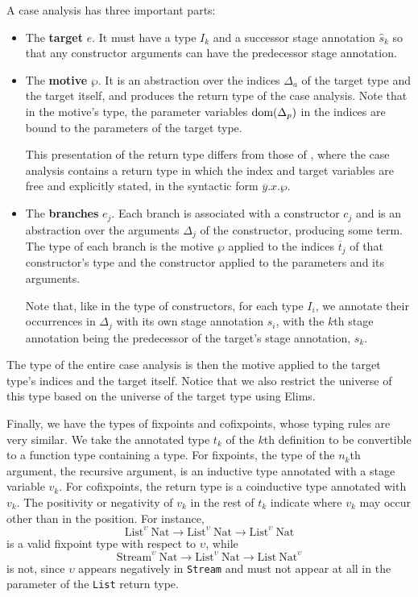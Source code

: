 \documentclass[nonacm,screen,10pt]{acmart}
\begin{document}
A case analysis has three important parts:
\begin{itemize}
    \item The \textbf{target} $e$. It must have a \coinductive type $I_k$ and a successor stage annotation $\hat{s}_k$ so that any constructor arguments can have the predecessor stage annotation.
    \item The \textbf{motive} $\wp$. It is an abstraction over the indices $\Delta_a$ of the target type and the target itself, and produces the return type of the case analysis. Note that in the motive's type, the parameter variables $\text{dom}(\Delta_p)$ in the indices are bound to the parameters of the target type.
    
    This presentation of the return type differs from those of \cite{cic-hat-bar, cic-hat-l, cc-hat-omega}, where the case analysis contains a return type in which the index and target variables are free and explicitly stated, in the syntactic form $\overline{y}.x.\wp$.
    \item The \textbf{branches} $e_j$. Each branch is associated with a constructor $c_j$ and is an abstraction over the arguments $\Delta_j$ of the constructor, producing some term. The type of each branch is the motive $\wp$ applied to the indices $\overline{t}_j$ of that constructor's type and the constructor applied to the parameters and its arguments.
    
    Note that, like in the type of constructors, for each \coinductive type $I_i$, we annotate their occurrences in $\Delta_j$ with its own stage annotation $s_i$, with the $k$th stage annotation being the predecessor of the target's stage annotation, $s_k$.
\end{itemize}
The type of the entire case analysis is then the motive applied to the target type's indices and the target itself. Notice that we also restrict the universe of this type based on the universe of the target type using Elims.

Finally, we have the types of fixpoints and cofixpoints, whose typing rules are very similar. We take the annotated type $t_k$ of the $k$th \cofixpoint definition to be convertible to a function type containing a \coinductive type. For fixpoints, the type of the $n_k$th argument, the recursive argument, is an inductive type annotated with a stage variable $v_k$. For cofixpoints, the return type is a coinductive type annotated with $v_k$. The positivity or negativity of $v_k$ in the rest of $t_k$ indicate where $v_k$ may occur other than in the \corecursive position. For instance,
\begin{equation*}
\text{List}^\upsilon\ \text{Nat} \to \text{List}^\upsilon\ \text{Nat} \to \text{List}^\upsilon\ \text{Nat}
\end{equation*}
is a valid fixpoint type with respect to $\upsilon$, while
\begin{equation*}
\text{Stream}^\upsilon\ \text{Nat} \to \text{List}^\upsilon\ \text{Nat} \to \text{List}\ \text{Nat}^\upsilon
\end{equation*}
is not, since $\upsilon$ appears negatively in \texttt{Stream} and must not appear at all in the parameter of the \texttt{List} return type.
\end{document}

